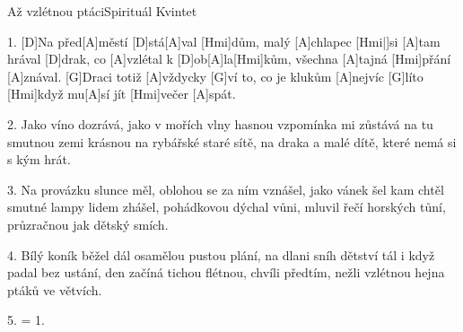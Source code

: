 \begin{song}{Až vzlétnou ptáci}{Spirituál Kvintet}


\begin{xverse}{1. }
[D]Na před[A]městí [D]stá[A]val [Hmi]dům, malý [A]chlapec [Hmi|]{si} [A]tam hrával
[D]drak, co [A]vzlétal k [D]ob[A]la[Hmi]kům, všechna [A]tajná [Hmi]přání [A]znával.
[G]Draci totiž [A]vždycky [G]ví to, co je klukům [A]nejvíc [G]líto
[Hmi]když mu[A]sí jít [Hmi]večer [A]spát.
\end{xverse}

\begin{xverse}{2. }
Jako víno dozrává, jako v mořích vlny hasnou
vzpomínka mi zůstává na tu smutnou zemi krásnou
na rybářské staré sítě, na draka a malé dítě,
které nemá si s kým hrát.
\end{xverse}

\begin{xverse}{3. }
Na provázku slunce měl, oblohou se za ním vznášel,
jako vánek šel kam chtěl smutné lampy lidem zhášel,
pohádkovou dýchal vůni, mluvil řečí horských tůní,
průzračnou jak dětský smích.
\end{xverse}

\begin{xverse}{4. }
Bílý koník běžel dál osamělou pustou plání,
na dlani sníh dětství tál i když padal bez ustání,
den začíná tichou flétnou, chvíli předtím, nežli vzlétnou
hejna ptáků ve větvích.
\end{xverse}

\begin{xverse}{5. }
= 1.
\end{xverse}

\end{song}

